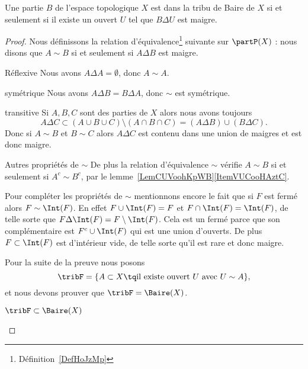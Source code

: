 \begin{proposition}  \label{PropGRHootvAWq}
    Une partie \( B\) de l'espace topologique \( X\) est dans la tribu de Baire de \( X\) si et seulement si il existe un ouvert \( U\) tel que \( B\Delta U\) est maigre.
\end{proposition}

\begin{proof}
    Nous définissons la relation d'équivalence\footnote{Définition~\ref{DefHoJzMp}} suivante sur \( \partP(X)\) : nous disons que \( A\sim B\) si et seulement si \( A\Delta B\) est maigre.
    \begin{subproof}
    \item[Réflexive]
        Nous avons \( A\Delta A=\emptyset\), donc \( A\sim A\).
    \item[symétrique] Nous avons \( A\Delta B=B\Delta A\), donc \( \sim\) est symétrique.
    \item[transitive] Si \( A,B,C\) sont des parties de \( X\) alors nous avons toujours
        \begin{equation}
            A\Delta C\subset (A\cup B\cup C)\setminus(A\cap B\cap C)=(A\Delta B)\cup (B\Delta C).
        \end{equation}
        Donc si \( A\sim B\) et \( B\sim C\) alors \( A\Delta C\) est contenu dans une union de maigres et est donc maigre.
    \item[Autres propriétés de \( \sim\)]
        De plus la relation d'équivalence \( \sim\) vérifie \( A\sim B\) si et seulement si \( A^c\sim B^c\), par le lemme~\ref{LemCUVoohKpWB}\ref{ItemVUCooHAztC}.

        Pour compléter les propriétés de \( \sim\) mentionnons encore le fait que si \( F\) est fermé alors \( F\sim\Int(F)\). En effet \( F\cup\Int(F)=F\) et \( F\cap\Int(F)=\Int(F)\), de telle sorte que \( F\Delta\Int(F)=F\setminus\Int(F)\). Cela est un fermé parce que son complémentaire est \( F^c\cup\Int(F)\) qui est une union d'ouverts. De plus \( F\subset\Int(F)\) est d'intérieur vide, de telle sorte qu'il est rare et donc maigre.
    \end{subproof}

    Pour la suite de la preuve nous posons
    \begin{equation}
        \tribF=\{ A\subset X\tq\text{il existe ouvert } U\text{ avec } U\sim A \},
    \end{equation}
    et nous devons prouver que \( \tribF=\Baire(X)\).

    \begin{subproof}
        \item[\( \tribF\subset\Baire(X)\)]


\end{subproof}
\end{proof}
